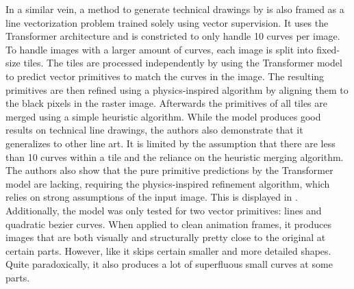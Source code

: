 In a similar vein, a method to generate technical drawings by \citet{DBLP:conf/eccv/EgiazarianVAVST20} is also framed as a line vectorization problem trained solely using vector supervision. It uses the Transformer architecture and is constricted to only handle 10 curves per image. To handle images with a larger amount of curves, each image is split into fixed-size tiles. The tiles are processed independently by using the Transformer model to predict vector primitives to match the curves in the image. The resulting primitives are then refined using a physics-inspired algorithm by aligning them to the black pixels in the raster image. Afterwards the primitives of all tiles are merged using a simple heuristic algorithm. While the model produces good results on technical line drawings, the authors also demonstrate that it generalizes to other line art. It is limited by the assumption that there are less than 10 curves within a tile and the reliance on the heuristic merging algorithm. The authors also show that the pure primitive predictions by the Transformer model are lacking, requiring the physics-inspired refinement algorithm, which relies on strong assumptions of the input image. This is displayed in . Additionally, the model was only tested for two vector primitives: lines and quadratic bezier curves. When applied to clean animation frames, it produces images that are both visually and structurally pretty close to the original at certain parts. However, like \citet{Puhachov2021KeypointPolyvector} it skips certain smaller and more detailed shapes. Quite paradoxically, it also produces a lot of superfluous small curves at some parts.

